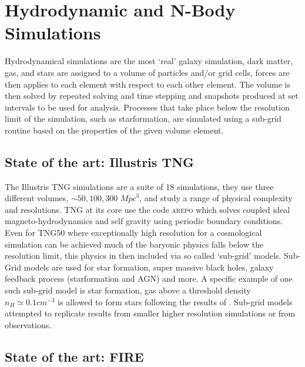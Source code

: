 \section{Hydrodynamic and N-Body Simulations}
\label{sec:Hydro}
Hydrodynamical simulations are the most `real' galaxy simulation, dark matter, gas, and stars are assigned to a volume of particles and/or grid cells, forces are then applies to each element with respect to each other element. The volume is then solved by repeated solving and time stepping and snapshots produced at set intervals to be used for analysis. Processes that take place below the resolution limit of the simulation, such as starformation, are simulated using a sub-grid routine based on the properties of the given volume element.

\subsection{State of the art: Illustris TNG}
The Illustris TNG simulations are a suite of 18 simulations, they use three different volumes, $\sim 50, 100, 300$ ${Mpc}^{3}$, and study a range of physical complexity and resolutions. TNG at its core use the code \textsc{arepo} \citep{Springel2010EMesh} which solves coupled ideal magneto-hydrodynamics and self gravity using periodic boundary conditions. Even for TNG50 where exceptionally high resolution for a cosmological simulation can be achieved much of the baryonic physics falls below the resolution limit, this physics in then included via so called `sub-grid' models. Sub-Grid models are used for star formation, super massive black holes, galaxy feedback process (starformation and AGN) and more. A specific example of one such sub-grid model is star formation, gas above a threshold density $n_H \simeq 0.1cm^{-3}$ is allowed to form stars following the results of \citet{Springel2003CosmologicalFormation}. Sub-grid models attempted to replicate results from smaller higher resolution simulations or from observations. 

\subsection{State of the art: FIRE}

